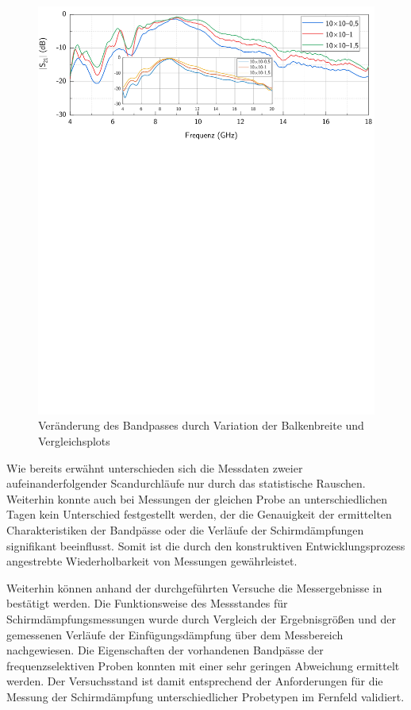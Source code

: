\begin{figure}[H]
    \centering
    \includegraphics[page=1, width=.99\textwidth, trim = 0cm 13.3cm 0cm 0cm, clip]{Abbildungen/Kapitel4/Messergebnisse/Vergleich_10x10.pdf}
    \caption[Veränderung des Bandpasses durch Variation der Balkenbreite]{Veränderung des Bandpasses durch Variation der Balkenbreite und Vergleichsplots~\cite{FSS_Toedter_Diplomarbeit}}\label{fig:4_Variation_Balkenbreite}
\end{figure}


Wie bereits erwähnt unterschieden sich die Messdaten zweier aufeinanderfolgender Scandurchläufe nur durch das statistische Rauschen. Weiterhin konnte auch bei Messungen der gleichen Probe an unterschiedlichen Tagen kein Unterschied festgestellt werden, der die Genauigkeit der ermittelten Charakteristiken der Bandpässe oder die Verläufe der Schirmdämpfungen signifikant beeinflusst. Somit ist die durch den konstruktiven Entwicklungsprozess angestrebte Wiederholbarkeit von Messungen gewährleistet. 
\par
\vspace{\linespace}
Weiterhin können anhand der durchgeführten Versuche die Messergebnisse in~\cite{FSS_Toedter_Diplomarbeit} bestätigt werden. Die Funktionsweise des Messstandes für Schirmdämpfungsmessungen wurde durch Vergleich der Ergebnis\-größen und der gemessenen Verläufe der Einfügungsdämpfung über dem Messbereich nachgewiesen. Die Eigenschaften der vorhandenen Bandpässe der frequenzselektiven Proben konnten mit einer sehr geringen Abweichung ermittelt werden. Der Versuchsstand ist damit entsprechend der Anforderungen für die Messung der Schirmdämpfung unterschiedlicher Probetypen im Fernfeld validiert. 




